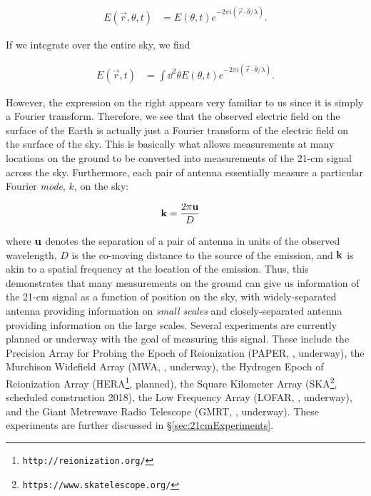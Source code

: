 \begin{align}
E(\vec{r},\theta,t) &= E(\theta,t)e^{-2\pi i (\vec{r} \cdot \hat{\theta}/\lambda)}.
\end{align}

If we integrate over the entire sky, we find

\begin{align}
E(\vec{r},t) &= \int \dd^{2} \theta E(\theta,t) e^{-2\pi i (\vec{r}\cdot \hat{\theta}/\lambda)}.
\end{align}

However, the expression on the right appears very familiar to us since it is simply a Fourier transform. Therefore, we see that the observed electric field on the surface of the Earth is actually just a Fourier transform of the electric field on the surface of the sky. This is basically what allows measurements at many locations on the ground to be converted into measurements of the 21-cm signal across the sky. Furthermore, each pair of antenna essentially measure a particular Fourier \textit{mode}, $k$, on the sky:

\begin{align}
{\bf k} &= \frac{2\pi {\bf u}}{D}\label{eq:modes}
\end{align}

where ${\bf u}$ denotes the separation of a pair of antenna in units of the observed wavelength, $D$ is the co-moving distance to the source of the emission, and ${\bf k}$ is akin to a spatial frequency at the location of the emission. Thus, this demonstrates that many measurements on the ground can give us information of the 21-cm signal as a function of position on the sky, with widely-separated antenna providing information on \textit{small scales} and closely-separated antenna providing information on the large scales. Several experiments are currently planned or underway with the goal of measuring this signal. These include the Precision Array for Probing the Epoch of Reionization (PAPER, \citealt{Parsons2012}, underway), the Murchison Widefield Array (MWA, \citealt{Tingay2012}, underway), the Hydrogen Epoch of Reionization Array (HERA\footnote{{\tt http://reionization.org/}}, planned), the Square Kilometer Array (SKA\footnote{{\tt https://www.skatelescope.org/}}, scheduled construction 2018), the Low Frequency Array (LOFAR, \citealt{2013A&A...550A.136Y}, underway), and the Giant Metrewave Radio Telescope (GMRT, \citealt{Paciga2011}, underway). These experiments are further discussed in \S \ref{sec:21cmExperiments}.


